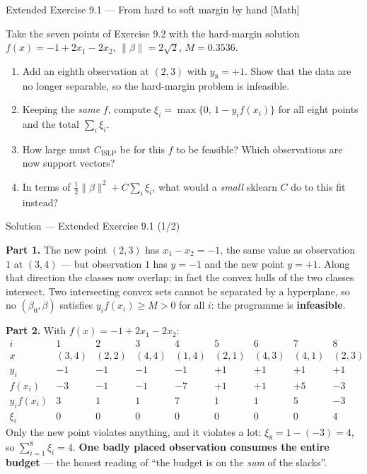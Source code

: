 \documentclass[aspectratio=169,11pt]{beamer}
\begin{document}
\begin{frame}{Extended Exercise 9.1 --- From hard to soft margin by hand [Math]}
\begin{longexercise}
  Take the seven points of Exercise 9.2 with the hard-margin solution
  $f(x)=-1+2x_1-2x_2$, $\|\beta\|=2\sqrt2$, $M=0.3536$.
  \begin{enumerate}
    \item Add an eighth observation at $(2,3)$ with $y_8=+1$. Show that the
          data are no longer separable, so the hard-margin problem is
          infeasible.
    \item Keeping the \emph{same} $f$, compute
          $\xi_i = \max\{0,\,1-y_i f(x_i)\}$ for all eight points and the total
          $\sum_i \xi_i$.
    \item How large must $C_{\text{ISLP}}$ be for this $f$ to be feasible?
          Which observations are now support vectors?
    \item In terms of $\tfrac12\|\beta\|^2 + C\sum_i\xi_i$, what would a
          \emph{small} sklearn $C$ do to this fit instead?
  \end{enumerate}
\end{longexercise}
\end{frame}

\begin{frame}{Solution --- Extended Exercise 9.1 (1/2)}
\begin{solutionbox}
  \scriptsize
  \textbf{Part 1.} The new point $(2,3)$ has $x_1-x_2=-1$, the same value as
  observation $1$ at $(3,4)$ --- but observation $1$ has $y=-1$ and the new
  point $y=+1$. Along that direction the classes now overlap; in fact the
  convex hulls of the two classes intersect. Two intersecting convex sets
  cannot be separated by a hyperplane, so no $(\beta_0,\beta)$ satisfies
  $y_if(x_i)\ge M>0$ for all $i$: the programme is \textbf{infeasible}.

  \textbf{Part 2.} With $f(x)=-1+2x_1-2x_2$:
  \[
    \begin{array}{c|cccccccc}
      i & 1 & 2 & 3 & 4 & 5 & 6 & 7 & 8\\ \hline
      x & (3,4) & (2,2) & (4,4) & (1,4) & (2,1) & (4,3) & (4,1) & (2,3)\\
      y_i & -1 & -1 & -1 & -1 & +1 & +1 & +1 & +1\\
      f(x_i) & -3 & -1 & -1 & -7 & +1 & +1 & +5 & -3\\
      y_i f(x_i) & 3 & 1 & 1 & 7 & 1 & 1 & 5 & -3\\
      \xi_i & 0 & 0 & 0 & 0 & 0 & 0 & 0 & 4
    \end{array}
  \]
  Only the new point violates anything, and it violates a lot:
  $\xi_8 = 1-(-3) = 4$, so $\sum_{i=1}^{8}\xi_i = 4$. \textbf{One badly placed
  observation consumes the entire budget} --- the honest reading of ``the budget
  is on the \emph{sum} of the slacks''.
\end{solutionbox}
\end{frame}
\end{document}
